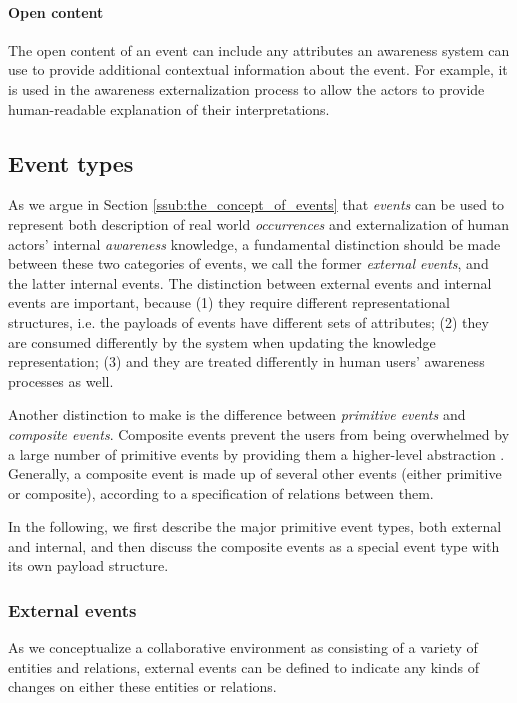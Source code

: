 \paragraph*{Open content} %
\label{par:open_content}
The open content of an event can include any attributes an awareness system can use to provide additional contextual information about the event. For example, it is used in the awareness externalization process to allow the actors to provide human-readable explanation of their interpretations.

\subsection{Event types} %
\label{sub:event_types}
As we argue in Section \ref{ssub:the_concept_of_events} that \emph{events} can be used to represent both description of real world \emph{occurrences} and externalization of human actors' internal \emph{awareness} knowledge, a fundamental distinction should be made between these two categories of events, we call the former \emph{external events}, and the latter {internal events}. The distinction between external events and internal events are important, because (1) they require different representational structures, i.e. the payloads of events have different sets of attributes; (2) they are consumed differently by the system when updating the knowledge representation; (3) and they are treated differently in  human users' awareness processes as well. 

Another distinction to make is the difference between \emph{primitive events} and \emph{composite events}. Composite events prevent the users from being overwhelmed by a large number of primitive events by providing them a higher-level abstraction \cite{Mhl2010}. Generally, a composite event is made up of several other events (either primitive or composite), according to a specification of relations between them. 

In the following, we first describe the major primitive event types, both external and internal, and then discuss the composite events as a special event type with its own payload structure.

\subsubsection{External events} %
\label{ssub:external_events}
As we conceptualize a collaborative environment as consisting of a variety of entities and relations, external events can be defined to indicate any kinds of changes on either these entities or relations. 

